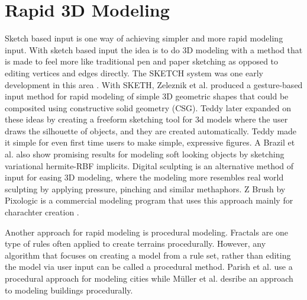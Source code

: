 \documentclass[a4paper,12pt]{report}
\begin{document}
\section{Rapid 3D Modeling}
 Sketch based input is one way of achieving simpler and more rapid modeling input. With sketch based input the idea is to do 3D modeling with a method that is made to feel more like traditional pen and paper sketching as opposed to editing vertices and edges directly.
The SKETCH system was one early development in this area \cite{zeleznik2007sketch}. With SKETH, Zeleznik et al. produced a gesture-based input method for rapid modeling of simple 3D geometric shapes that could be composited using constructive solid geometry (CSG). Teddy \cite{Igarashi:1999:TSI:311535.311602} later expanded on these ideas by creating a freeform sketching tool for 3d models where the user draws the silhouette of objects, and they are created automatically. Teddy made it simple for even first time users to make simple, expressive figures. A Brazil et al. \cite{brazil2010sketching} also show promising results for modeling soft looking objects by sketching variational hermite-RBF implicits.
Digital sculpting is an alternative method of input for easing 3D modeling, where the modeling more resembles real world sculpting by applying pressure, pinching and similar methaphors. Z Brush by Pixologic is a commercial modeling program that uses this approach mainly for charachter creation \cite{spencer2008zbrush}.

Another approach for rapid modeling is procedural modeling. Fractals are one type of rules often applied to create terrains procedurally.  However, any algorithm that focuses on creating a model from a rule set, rather than editing the model via user input can be called a procedural method. Parish et al. \cite{parish2001procedural} use a procedural approach for modeling cities while Müller \cite{muller2006procedural} et al. desribe an approach to modeling buildings procedurally. 
 
\end{document}
